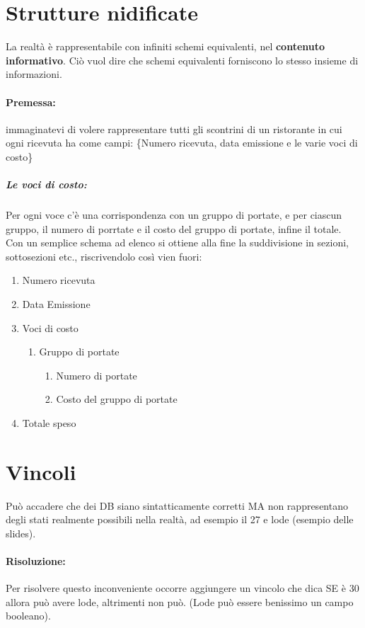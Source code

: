 \documentclass[12pt, a4paper, openany, twoside]{book}
\begin{document}
\section{Strutture nidificate}
La realtà è rappresentabile con infiniti schemi equivalenti, nel \textbf{contenuto
informativo}. Ciò vuol dire che schemi equivalenti forniscono lo stesso
insieme di informazioni.
\paragraph{Premessa:} immaginatevi di volere rappresentare tutti gli scontrini di
un ristorante in cui ogni ricevuta ha come campi: \{Numero ricevuta, data emissione
e le varie voci di costo\}
\subparagraph{Le voci di costo:} Per ogni voce c'è una corrispondenza con un 
gruppo di portate, e per ciascun gruppo, il numero di porrtate e il costo del gruppo 
di portate, infine il totale.\\
Con un semplice schema ad elenco si ottiene alla fine la suddivisione in sezioni,
sottosezioni etc., riscrivendolo così vien fuori:
\begin{enumerate}
	\item Numero ricevuta
	\item Data Emissione
	\item Voci di costo
	\begin{enumerate}
		\item Gruppo di portate
		\begin{enumerate}
			\item Numero di portate
			\item Costo del gruppo di portate
		\end{enumerate}
	\end{enumerate}
	\item Totale speso
\end{enumerate}
\section{Vincoli}
Può accadere che dei DB siano sintatticamente corretti MA non rappresentano degli
stati realmente possibili nella realtà, ad esempio il 27 e lode (esempio delle
slides).
\paragraph{Risoluzione:} Per risolvere questo inconveniente occorre aggiungere
un vincolo che dica SE è 30 allora può avere lode, altrimenti non può. (Lode
può essere benissimo un campo booleano).
\end{document}
